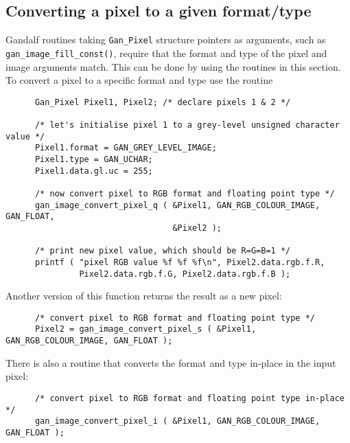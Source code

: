 \subsection{Converting a pixel to a given format/type}
\label{convert-pixel-sec}
Gandalf routines taking {\tt Gan\_Pixel} structure pointers as arguments,
such as {\tt gan\_image\_fill\_const()}, require that the format and type
of the pixel and image arguments match. This can be done by using the
routines in this section. To convert a pixel to a specific format and type
use the routine
\begin{verbatim}
      Gan_Pixel Pixel1, Pixel2; /* declare pixels 1 & 2 */

      /* let's initialise pixel 1 to a grey-level unsigned character value */
      Pixel1.format = GAN_GREY_LEVEL_IMAGE;
      Pixel1.type = GAN_UCHAR;
      Pixel1.data.gl.uc = 255;

      /* now convert pixel to RGB format and floating point type */
      gan_image_convert_pixel_q ( &Pixel1, GAN_RGB_COLOUR_IMAGE, GAN_FLOAT,
                                  &Pixel2 );

      /* print new pixel value, which should be R=G=B=1 */
      printf ( "pixel RGB value %f %f %f\n", Pixel2.data.rgb.f.R,
               Pixel2.data.rgb.f.G, Pixel2.data.rgb.f.B );
\end{verbatim}
Another version of this function returns the result as a new pixel:
\begin{verbatim}
      /* convert pixel to RGB format and floating point type */
      Pixel2 = gan_image_convert_pixel_s ( &Pixel1, GAN_RGB_COLOUR_IMAGE, GAN_FLOAT );
\end{verbatim}
There is also a routine that converts the format and type in-place in the
input pixel:
\begin{verbatim}
      /* convert pixel to RGB format and floating point type in-place */
      gan_image_convert_pixel_i ( &Pixel1, GAN_RGB_COLOUR_IMAGE, GAN_FLOAT );
\end{verbatim}

